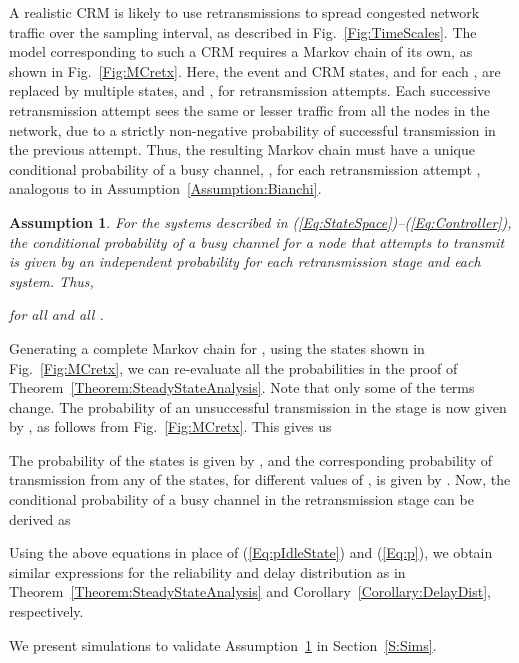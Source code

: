 \documentclass[journal]{IEEEtran}
\newtheorem{assumption}{Assumption}[section]
\begin{document}
\begin{figure*}[!t]
\begin{center}
 \caption{Embedding a CRM with  distinct re-transmission stages in the Markov chain model} \label{Fig:MCretx}
\end{center}
\end{figure*}

A realistic CRM is likely to use retransmissions to spread congested network traffic over the sampling interval, as described in Fig.~\ref{Fig:TimeScales}. The model corresponding to such a CRM requires a Markov chain of its own, as shown in Fig.~\ref{Fig:MCretx}. Here, the event and CRM states,  and  for each , are replaced by multiple states,  and , for  retransmission attempts. Each successive retransmission attempt sees the same or lesser traffic from all the nodes in the network, due to a strictly non-negative probability of successful transmission in the previous attempt. Thus, the resulting Markov chain must have a unique conditional probability of a busy channel, , for each retransmission attempt , analogous to  in Assumption~\ref{Assumption:Bianchi}.
\begin{assumption} \label{Assumption:BianchiMulti}
For the systems described in (\ref{Eq:StateSpace})--(\ref{Eq:Controller}), the conditional probability of a busy channel for a node that attempts to transmit is given by an independent probability  for each retransmission stage and each system. Thus,

for all  and all .
\end{assumption}

Generating a complete Markov chain for , using the states shown in Fig.~\ref{Fig:MCretx}, we can re-evaluate all the probabilities in the proof of Theorem~\ref{Theorem:SteadyStateAnalysis}. Note that only some of the terms change. The probability of an unsuccessful transmission in the  stage is now given by , as follows from Fig.~\ref{Fig:MCretx}. This gives us

The probability of the states  is given by , and the corresponding probability of transmission from any of the  states, for different values of , is given by . Now, the conditional probability of a busy channel in the  retransmission stage can be derived as

Using the above equations in place of (\ref{Eq:pIdleState}) and (\ref{Eq:p}), we obtain similar expressions for the reliability and delay distribution as in Theorem~\ref{Theorem:SteadyStateAnalysis} and Corollary~\ref{Corollary:DelayDist}, respectively.

We present simulations to validate Assumption~\ref{Assumption:BianchiMulti} in Section~\ref{S:Sims}.
\end{document}
